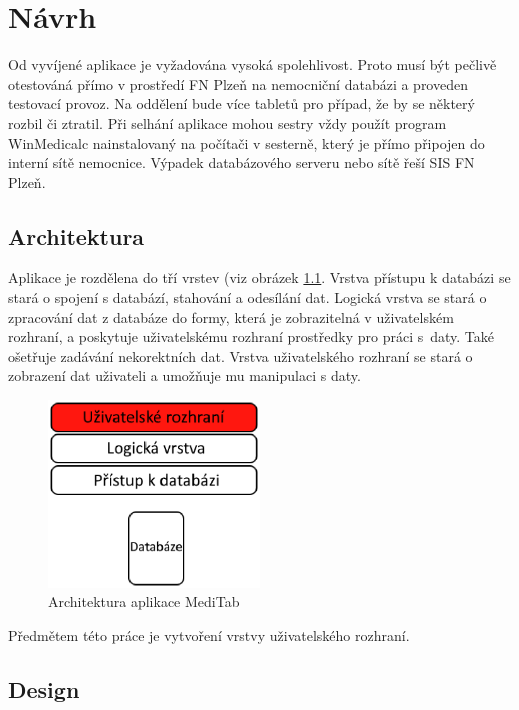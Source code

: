 \chapter{Návrh}
\label{ch:navrh}

Od vyvíjené aplikace je vyžadována vysoká spolehlivost. Proto musí být pečlivě otestováná přímo v prostředí FN Plzeň na nemocniční databázi a proveden testovací provoz. Na oddělení bude více tabletů pro případ, že by se některý rozbil či ztratil. Při selhání aplikace mohou sestry vždy použít program WinMedicalc nainstalovaný na počítači v sesterně, který je přímo připojen do interní sítě nemocnice. Výpadek databázového serveru nebo sítě řeší SIS FN Plzeň.

\section{Architektura}

Aplikace je rozdělena do tří vrstev (viz obrázek \ref{fig:architektura}. Vrstva přístupu k databázi se stará o spojení s databází, stahování a odesílání dat. Logická vrstva se stará o zpracování dat z databáze do formy, která je zobrazitelná v uživatelském rozhraní, a poskytuje uživatelskému rozhraní prostředky pro práci s~daty. Také ošetřuje zadávání nekorektních dat. Vrstva uživatelského rozhraní se stará o zobrazení dat uživateli a umožňuje mu manipulaci s daty.

\begin{figure}[H]
	\centering
	\includegraphics[width=0.5\textwidth]{img/architektura.eps}
	\caption{Architektura aplikace MediTab}
  \label{fig:architektura}
\end{figure}

Předmětem této práce je vytvoření vrstvy uživatelského rozhraní.


\section{Design}

